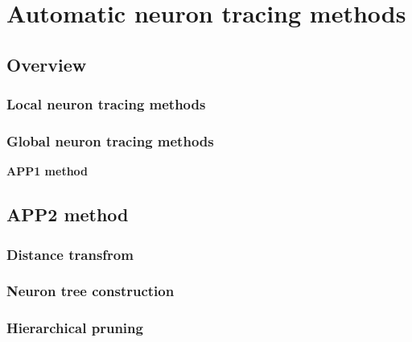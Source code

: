 \chapter{Automatic neuron tracing methods} \label{chpt:auto-nt}
\section{Overview}
\subsection{Local neuron tracing methods}
\subsection{Global neuron tracing methods}
\textbf{APP1 method}
\section{APP2 method}
\subsection{Distance transfrom}
\subsection{Neuron tree construction}
\subsection{Hierarchical pruning}

